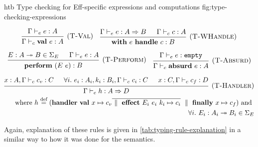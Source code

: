 \documentclass[class=article, crop=false]{standalone}
\begin{document}
\begin{myfigure}[1]{htb}
{Type checking for Eff-specific expressions and computations}
{fig:type-checking-expressions}

$$
    \begin{prooftree}
      \hypo{\Gamma \vdash_e e : A}
      \infer1[(\textsc{T-Val})]{\Gamma \vdash_c \effVal e : A}
    \end{prooftree}
    \quad
    \begin{prooftree}
      \hypo{\Gamma \vdash_e e : A \handlerType B}
      \hypo{\Gamma \vdash_c c : A}
      \infer2[(\textsc{T-WHandle})]{\effWith e \effHandle c : B}
    \end{prooftree}
  $$

  $$
    \begin{prooftree}
      \hypo{E : A \tto B \in \Sigma_E}
      \hypo{\Gamma \vdash_e e : A}
      \infer2[(\textsc{T-Perform})]{\effPerform (E\ e) : B}
    \end{prooftree}
    \quad
    \begin{prooftree}
      \hypo{\Gamma \vdash_e e : \emptyType}
      \infer1[(\textsc{T-Absurd})]{\Gamma \vdash_c \effAbsurd e : A}
    \end{prooftree}
  $$

  \begin{align*}
    {\begin{prooftree}
      \hypo{x : A, \Gamma \vdash_c c_v : C}
      \hypo{\forall i.\ e_i : A_i, k_i : B_i, \Gamma \vdash_c c_i : C}
      \hypo{x : C, \Gamma \vdash_c c_f : D}
      \infer3[(\textsc{T-Handler})]{\Gamma \vdash_e h : A \handlerType D}
    \end{prooftree}}\\
    \text{ where }
    h \defEq (
      \effHandler
        \effVal x \mapsto c_v
        \overline{\dmid \effEffect E_i\ e_i\ k_i \mapsto c_i} \dmid
        \effFinally x \mapsto c_f)
    \text{ and } \\ \forall i.\ E_i : A_i \tto B_i \in \Sigma_E
  \end{align*}
\end{myfigure}
%
Again, explanation of these rules is given in
\autoref{tab:typing-rule-explanation} in a similar way to how it was done for
the semantics.
\end{document}

